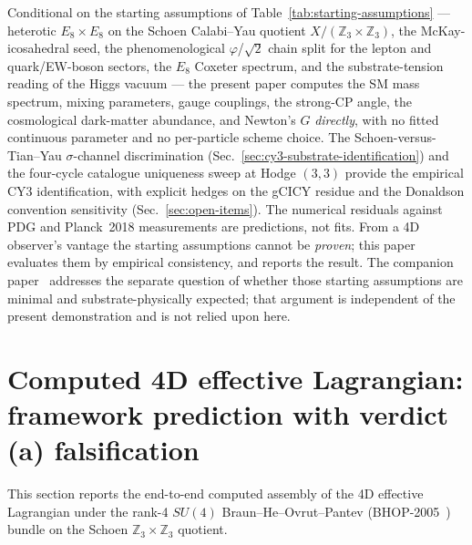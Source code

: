 ﻿\documentclass[reprint,amsmath,amssymb,aps,prd,longbibliography,floatfix]{revtex4-2}
\begin{document}
Conditional on the starting assumptions of
Table~\ref{tab:starting-assumptions} --- heterotic
$E_8 \times E_8$ on the Schoen Calabi--Yau quotient
$X/(\mathbb{Z}_3 \times \mathbb{Z}_3)$, the McKay-icosahedral seed,
the phenomenological $\varphi$/$\sqrt{2}$ chain split for the lepton
and quark/EW-boson sectors, the $E_8$ Coxeter spectrum, and the
substrate-tension reading of the Higgs vacuum --- the present paper computes the SM
mass spectrum, mixing parameters, gauge couplings, the strong-CP
angle, the cosmological dark-matter abundance, and Newton's $G$
\emph{directly}, with no fitted continuous parameter and no
per-particle scheme choice. The Schoen-versus-Tian--Yau
$\sigma$-channel discrimination (Sec.~\ref{sec:cy3-substrate-identification})
and the four-cycle catalogue uniqueness sweep at Hodge $(3,3)$
provide the empirical CY3 identification, with explicit hedges on
the gCICY residue and the Donaldson convention sensitivity
(Sec.~\ref{sec:open-items}). The numerical residuals against PDG and
Planck~2018 measurements are predictions, not fits. From a 4D
observer's vantage the starting assumptions cannot be \emph{proven};
this paper evaluates them by empirical consistency, and reports the
result. The companion paper~\cite{UnreasonableEffectiveness}
addresses the separate question of whether those starting assumptions
are minimal and substrate-physically expected; that argument is
independent of the present demonstration and is not relied upon here.

\section{Computed 4D effective Lagrangian: framework prediction with verdict (a) falsification}
\label{sec:stage4-lagrangian}

This section reports the end-to-end computed assembly of the 4D
effective Lagrangian under the rank-4 $SU(4)$ Braun--He--Ovrut--Pantev
(BHOP-2005~\cite{BHOP2005a,BHOP2005b}) bundle on the Schoen
$\mathbb{Z}_3 \times \mathbb{Z}_3$ quotient.
\end{document}
